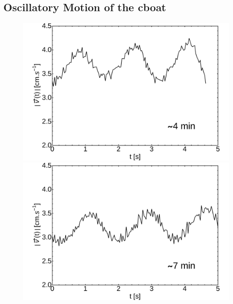 \documentclass[journal=langd5, manuscript=article, layout=twocolumn]{achemso}
\begin{document}
\subsection{Oscillatory Motion of the cboat}
\label{sec:oscboat}
\begin{figure}[ht]
    \centering
	\begin{minipage}[c]{0.3\linewidth}
		\centering
		\includegraphics[width=\textwidth]{uvst_72dypcm_a.pdf}
	\end{minipage}
	\begin{minipage}[c]{0.3\linewidth}
		\centering
		\includegraphics[width=\textwidth]{uvst_72dypcm_b.pdf}
	\end{minipage}
	\begin{minipage}[c]{0.3\linewidth}
		\centering

\end{minipage}
\end{figure}
\end{document}
